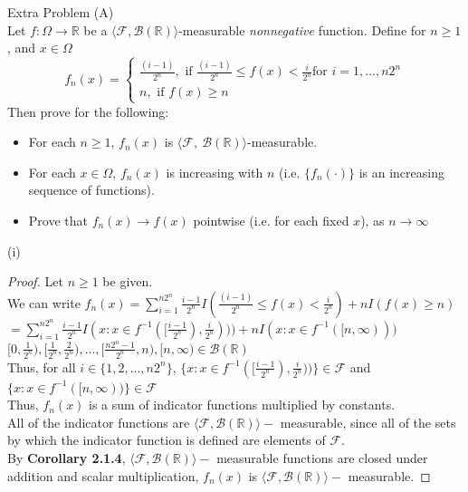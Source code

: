 \documentclass[12pt,letterpaper, onecolumn]{exam}
\newcommand{\ifc}{\textrm{ if }}
\newcommand{\real}{\mathbb{R}}
\newcommand{\calF}{\mathcal{F}}
\newcommand{\tribrac}[1]{\langle #1 \rangle}
\newcommand{\borel}{\mathcal{B}(\mathbb{R})}
\begin{document}
\begin{questions}
    \question Extra Problem (A) \\
    Let $f: \Omega \to \real$ be a $\tribrac{\calF, \borel}$-measurable \textit{nonnegative} function. Define for $n \geq 1$, and $x \in \Omega$
    \[f_n(x) = \begin{cases}
        \frac{(i - 1)}{2^n}, \ifc \frac{(i - 1)}{2^n} \leq f(x) < \frac{i}{2^n} \textrm{for } i = 1, ... , n2^n \\
        n, \ifc f(x) \geq n
    \end{cases}\]
    Then prove for the following:
    \begin{itemize}
        \item[(i)] For each $n \geq 1$, $f_n(x)$ is $\tribrac{\calF, \: \borel}$-measurable.
        \item[(ii)] For each $x \in \Omega$, $f_n(x)$ is increasing with $n$ (i.e. $\{f_n(\cdot)\}$ is an increasing sequence of functions). 
        \item[(iii)] Prove that $f_n(x) \to f(x)$ pointwise (i.e. for each fixed $x$), as $n \to \infty$ 
    \end{itemize}
    \begin{solution}
        (i) 
        \begin{proof} 
        Let $n \geq 1$ be given. \\
        We can write $f_n(x) = \sum_{i = 1}^{n2^n} \frac{i - 1}{2^n} I(\frac{(i - 1)}{2^n} \leq f(x) < \frac{i}{2^n}) + n I(f(x) \geq n)$ \\
        $ = \sum_{i = 1}^{n2^n} \frac{i - 1}{2^n} I(x : x \in f^{-1}([\frac{i - 1}{2^n}), \frac{i}{2^n}))) + n I(x : x \in f^{-1}([n, \infty)))$ \\
        $[0, \frac{1}{2^n}), [\frac{1}{2^n}, \frac{2}{2^n}), ... , [\frac{n2^n - 1}{2^n}, n), [n, \infty) \in \borel $ \\
        Thus, for all $i \in \{1, 2, ... , n2^n\}$, $\{x : x \in f^{-1}([\frac{i - 1}{2^n}), \frac{i}{2^n}))\} \in \calF$ and \\ $\{x: x \in f^{-1}([n, \infty))\} \in \calF$ \\
        Thus, $f_n(x)$ is a sum of indicator functions multiplied by constants. \\ All of the indicator functions are $\tribrac{\calF, \borel}-$ measurable, since all of the sets by which the indicator function is defined are elements of $\calF$. \\
        By \textbf{Corollary 2.1.4}, $\tribrac{\calF, \borel}-$ measurable functions are closed under addition and scalar multiplication, $f_n(x)$ is $\tribrac{\calF, \borel}-$ measurable.
        \end{proof}


\end{solution}
\end{questions}
\end{document}
